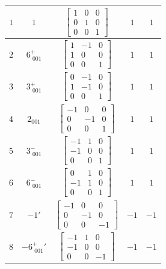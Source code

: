\documentclass[fleqn,8pt]{jsarticle}
\begin{document}
\begin{longtable}{ccccc}
$ 1 $ & $ 1 $ & $ \begin{bmatrix} 1 & 0 & 0 \\ 0 & 1 & 0 \\ 0 & 0 & 1 \end{bmatrix} $ & $ 1 $ & $ 1 $ \\ \hline
$ 2 $ & $ 6^{+}_{\,\,001} $ & $ \begin{bmatrix} 1 & -1 & 0 \\ 1 & 0 & 0 \\ 0 & 0 & 1 \end{bmatrix} $ & $ 1 $ & $ 1 $ \\ \hline
$ 3 $ & $ 3^{+}_{\,\,001} $ & $ \begin{bmatrix} 0 & -1 & 0 \\ 1 & -1 & 0 \\ 0 & 0 & 1 \end{bmatrix} $ & $ 1 $ & $ 1 $ \\ \hline
$ 4 $ & $ 2{}_{001} $ & $ \begin{bmatrix} -1 & 0 & 0 \\ 0 & -1 & 0 \\ 0 & 0 & 1 \end{bmatrix} $ & $ 1 $ & $ 1 $ \\ \hline
$ 5 $ & $ 3^{-}_{\,\,001} $ & $ \begin{bmatrix} -1 & 1 & 0 \\ -1 & 0 & 0 \\ 0 & 0 & 1 \end{bmatrix} $ & $ 1 $ & $ 1 $ \\ \hline
$ 6 $ & $ 6^{-}_{\,\,001} $ & $ \begin{bmatrix} 0 & 1 & 0 \\ -1 & 1 & 0 \\ 0 & 0 & 1 \end{bmatrix} $ & $ 1 $ & $ 1 $ \\ \hline
$ 7 $ & $ -1{}' $ & $ \begin{bmatrix} -1 & 0 & 0 \\ 0 & -1 & 0 \\ 0 & 0 & -1 \end{bmatrix} $ & $ -1 $ & $ -1 $ \\ \hline
$ 8 $ & $ -6^{+}_{\,\,001}{}' $ & $ \begin{bmatrix} -1 & 1 & 0 \\ -1 & 0 & 0 \\ 0 & 0 & -1 \end{bmatrix} $ & $ -1 $ & $ -1 $ \\ \hline

\end{longtable}
\end{document}
